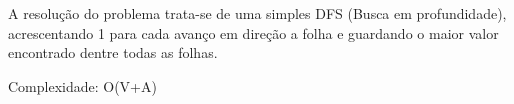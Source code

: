 A resolução do problema trata-se de uma simples DFS (Busca em profundidade), 
acrescentando 1 para cada avanço em direção a folha e guardando o maior valor encontrado
dentre todas as folhas.

Complexidade: O(V+A)